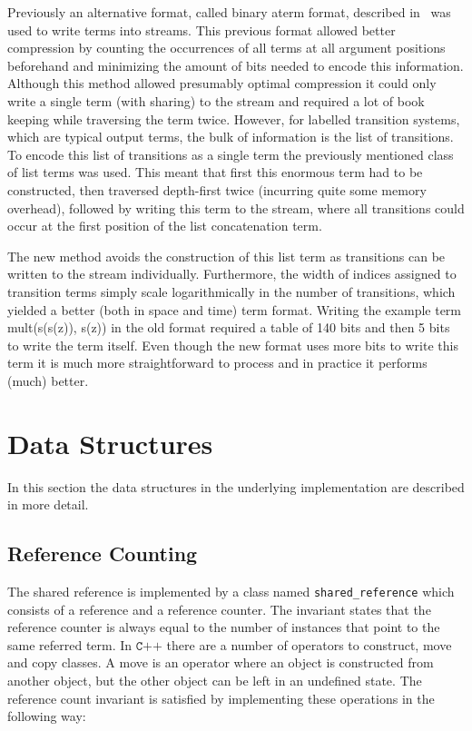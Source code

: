 \documentclass[10pt,a4paper]{article}
\theoremstyle{definition}
\newcommand{\cpp}{\texttt{C++}}
\begin{document}
Previously an alternative format, called binary aterm format, described in~\cite{BJKO99} was used to write terms into streams.
This previous format allowed better compression by counting the occurrences of all terms at all argument positions beforehand and minimizing the amount of bits needed to encode this information.
Although this method allowed presumably optimal compression it could only write a single term (with sharing) to the stream and required a lot of book keeping while traversing the term twice.
However, for labelled transition systems, which are typical output terms, the bulk of information is the list of transitions.
To encode this list of transitions as a single term the previously mentioned class of list terms was used.
This meant that first this enormous term had to be constructed, then traversed depth-first twice (incurring quite some memory overhead), followed by writing this term to the stream, where all transitions could occur at the first position of the list concatenation term.

The new method avoids the construction of this list term as transitions can be written to the stream individually.
Furthermore, the width of indices assigned to transition terms simply scale logarithmically in the number of transitions, which yielded a better (both in space and time) term format.
Writing the example term mult(s(s(z)), s(z)) in the old format required a table of 140 bits and then 5 bits to write the term itself.
Even though the new format uses more bits to write this term it is much more straightforward to process and in practice it performs (much) better.
 
\section{Data Structures}

In this section the data structures in the underlying implementation are described in more detail.

\subsection{Reference Counting}

The shared reference is implemented by a class named \texttt{shared\_reference} which consists of a reference and a reference counter. 
The invariant states that the reference counter is always equal to the number of instances that point to the same referred term. 
In $\cpp$ there are a number of operators to construct, move and copy classes.
A move is an operator where an object is constructed from another object, but the other object can be left in an undefined state.
The reference count invariant is satisfied by implementing these operations in the following way:
\end{document}

